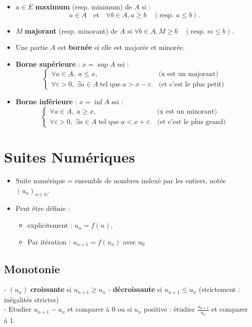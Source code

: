 \documentclass[a4paper,10pt]{article}
\begin{document}
\begin{itemize}[label={\tiny$\bullet$}]
	\item  \( a \in E \)  \textbf{maximum} (resp. minimum) de \( A \) si :
	\[
	a \in A \quad \text{et} \quad \forall b \in A, a \geq b \quad (\text{resp. } a \leq b).
	\]
	\item \( M \)  \textbf{majorant} (resp. minorant) de \( A \) si \( \forall b \in A, M \geq b \quad (\text{resp. } m \leq b) \).
	\item Une partie \( A \) est \textbf{bornée} si elle est majorée et minorée.
	\item \textbf{Borne supérieure} : \(x = \sup A\) ssi :
	\[
	\begin{cases}
    	\forall a \in A, \; a \leq x, & \text{(x est un majorant)} \\
    	\forall \varepsilon > 0, \; \exists a \in A \; \text{tel que} \; a > x - \varepsilon. & \text{(et c'est le plus petit)}
	\end{cases}
	\]

	\item \textbf{Borne inférieure } :  \(x = \inf A\) ssi :
	\[
	\begin{cases}
    	\forall a \in A, \; a \geq x, & \text{(x est un minorant)} \\
    	\forall \varepsilon > 0, \; \exists a \in A \; \text{tel que} \; a < x + \varepsilon. & \text{(et c'est le plus grand)}
	\end{cases}
	\]

\end{itemize}


\section*{Suites Numériques}


\begin{itemize}
	\item Suite numérique = ensemble de nombres indexé par les entiers, notée \( (u_n)_{n \in \mathbb{N}} \).
	\item Peut être définie :
	\begin{itemize}
    	\item explicitement : \( u_n = f(n) \),
    	\item Par itération : \( u_{n+1} = f(u_n) \) avec \( u_0 \)

	\end{itemize}
\end{itemize}


\subsection*{Monotonie}
- \( (u_n) \) \textbf{croissante} si \( u_{n+1} \geq u_n \)
-  \textbf{décroissante} si \( u_{n+1} \leq u_n \) (strictement : inégalités strictes) \\
- Etudier \( u_{n+1} - u_n \) et comparer à 0 ou si \( u_{n} \) positive : étudier \( \frac{u_{n+1}}{u_n} \) et comparer à 1.
\end{document}
